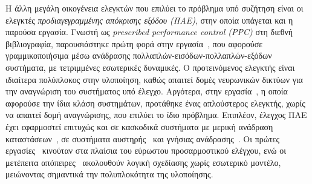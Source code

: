 Η άλλη μεγάλη οικογένεια ελεγκτών που επιλύει το πρόβλημα υπό συζήτηση είναι οι ελεγκτές \emph{προδιαγεγραμμένης απόκρισης εξόδου (ΠΑΕ)}, στην οποία υπάγεται και η παρούσα εργασία. Γνωστή ως \textlatin{\emph{prescribed performance control (PPC)}} στη διεθνή βιβλιογραφία, παρουσιάστηκε πρώτη φορά στην εργασία~\cite{bechlioulis2008robust}, που αφορούσε γραμμικοποιήσιμα μέσω ανάδρασης πολλαπλών-εισόδων-πολλαπλών-εξόδων συστήματα, με τετριμμένες εσωτερικές δυναμικές. Ο προτεινόμενος ελεγκτής είναι ιδιαίτερα πολύπλοκος στην υλοποίηση, καθώς απαιτεί δομές νευρωνικών δικτύων για την αναγνώριση του συστήματος υπό έλεγχο. Αργότερα, στην εργασία~\cite{Theodorakopoulos2016}, η οποία αφορούσε την ίδια κλάση συστημάτων, προτάθηκε ένας απλούστερος ελεγκτής, χωρίς να απαιτεί δομή αναγνώρισης, που επιλύει το ίδιο πρόβλημα. Επιπλέον, έλεγχος ΠΑΕ έχει εφαρμοστεί επιτυχώς και σε κασκοδικά συστήματα με μερική ανάδραση καταστάσεων~\cite{bechlioulis2011robust}, σε συστήματα αυστηρής~\cite{bechlioulis2009adaptive} και γνήσιας ανάδρασης~\cite{bechlioulis2014low}. Οι πρώτες εργασίες~\cite{bechlioulis2008robust, bechlioulis2009adaptive, bechlioulis2010prescribed} κινούταν στα πλαίσια του εύρωστου προσαρμοστικού ελέγχου, ενώ οι μετέπειτα απόπειρες~\cite{bechlioulis2011robust, bechlioulis2014low, Theodorakopoulos2016} ακολουθούν λογική σχεδίασης χωρίς εσωτερικό μοντέλο, μειώνοντας σημαντικά την πολυπλοκότητα της υλοποίησης.


